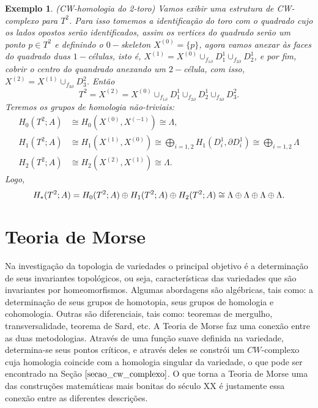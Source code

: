 \documentclass[12pt]{book}
\newtheorem{exemplo}[teorema]{Exemplo}
\newcommand{\celula}[2]{D^{#1}_{#2}}
\newcommand{\homologia}[2]{H_{#1}(#2;A)}
\newcommand{\homologiarelcel}[3]{H_{#1}(D^{#2}_{#3}, \partial D^{#2}_{#3})}
\newcommand{\homologiarelskele}[3]{H_{#1}(X^{(#2)}, X^{(#3)})}
\newcommand{\somadir}[1]{\bigoplus \limits_{#1}}
\newcommand{\skeleton}[1]{X^{(#1)}}
\begin{document}
	\begin{exemplo}
		(CW-homologia do 2-toro) Vamos exibir uma estrutura de CW-complexo para $T^{2}$. Para isso tomemos a identificação do toro com o quadrado cujo os lados opostos serão identificados, assim os vertices do quadrado serão um ponto $p \in T^{2}$ e definindo o $0-$skeleton $\skeleton{0} = \{p\}$, agora vamos anexar às faces do quadrado duas $1-$células, isto é, $\skeleton{1} = \skeleton{0}\cup_{f_{1\partial}}\celula{1}{1}\cup_{f_{2\partial}}\celula{1}{2}$, e por fim, cobrir o centro do quandrado anexando um $2-$célula, com isso, $\skeleton{2} = \skeleton{1}\cup_{f_{3\partial}}\celula{2}{3}$. Então
		$$
		T^{2} =\skeleton{2} = \skeleton{0}\cup_{f_{1\partial}}\celula{1}{1}\cup_{f_{2\partial}}\celula{1}{2}\cup_{f_{3\partial}}\celula{2}{3}.
		$$
		Teremos os grupos de homologia não-triviais:
		$$
		\begin{aligned}
		\homologia{0}{T^{2}} &\cong \homologiarelskele{0}{0}{-1} \cong \Lambda,
		\\
		\homologia{1}{T^{2}} &\cong \homologiarelskele{1}{1}{0} \cong \somadir{i=1,2}\homologiarelcel{1}{1}{i} \cong \somadir{i=1,2}\Lambda
		\\
		\homologia{2}{T^{2}} &\cong \homologiarelskele{2}{2}{1} \cong \Lambda.
		\end{aligned}
		$$
		Logo,
		$$
		\\
		\homologia{*}{T^{2}} = \homologia{0}{T^{2}}\oplus\homologia{1}{T^{2}} \oplus\homologia{2}{T^{2}}\cong \Lambda\oplus\Lambda\oplus\Lambda\oplus\Lambda.
		$$
	\end{exemplo}	
	
	
	\chapter{Teoria de Morse}\label{capitulo_teoria_morse}
	Na investigação da topologia de variedades o principal objetivo é a determinação de seus invariantes topológicos, ou seja, características das variedades que são invariantes por homeomorfismos. Algumas abordagens são algébricas, tais como: a determinação de seus grupos de homotopia, seus grupos de homologia e cohomologia. Outras são diferenciais, tais como: teoremas de mergulho, transversalidade, teorema de Sard, etc. A Teoria de Morse faz uma conexão entre as duas metodologias. Através de uma função suave definida na variedade, determina-se seus pontos críticos, e através deles se constrói um $CW$-complexo cuja homologia coincide com a homologia singular da variedade, o que pode ser encontrado na Seção $\ref{secao_cw_complexo}$. O que torna a Teoria de Morse uma das construções matemáticas mais bonitas do século XX é justamente essa conexão entre as diferentes descrições.
	
\end{document}
